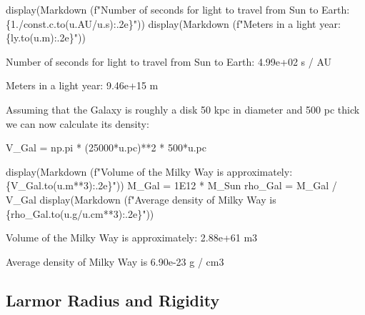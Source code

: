 \documentclass[
  letterpaper,
  DIV=11,
  numbers=noendperiod]{scrreprt}
\newenvironment{Shaded}{\begin{snugshade}}{\end{snugshade}}
\newcommand{\DecValTok}[1]{\textcolor[rgb]{0.68,0.00,0.00}{#1}}
\newcommand{\FloatTok}[1]{\textcolor[rgb]{0.68,0.00,0.00}{#1}}
\newcommand{\NormalTok}[1]{\textcolor[rgb]{0.00,0.23,0.31}{#1}}
\newcommand{\OperatorTok}[1]{\textcolor[rgb]{0.37,0.37,0.37}{#1}}
\newcommand{\SpecialCharTok}[1]{\textcolor[rgb]{0.37,0.37,0.37}{#1}}
\newcommand{\SpecialStringTok}[1]{\textcolor[rgb]{0.13,0.47,0.30}{#1}}
\begin{document}
\begin{tcolorbox}[enhanced jigsaw, toprule=.15mm, colframe=quarto-callout-color-frame, bottomrule=.15mm, leftrule=.75mm, left=2mm, breakable, rightrule=.15mm, arc=.35mm, opacityback=0, colback=white]
\begin{Shaded}
\begin{Highlighting}[]
\NormalTok{display(Markdown (}\SpecialStringTok{f"Number of seconds for light to travel from Sun to Earth: }\SpecialCharTok{\{}\FloatTok{1.}\OperatorTok{/}\NormalTok{const}\SpecialCharTok{.}\NormalTok{c}\SpecialCharTok{.}\NormalTok{to(u.AU}\OperatorTok{/}\NormalTok{u.s)}\SpecialCharTok{:.2e\}}\SpecialStringTok{"}\NormalTok{))}
\NormalTok{display(Markdown (}\SpecialStringTok{f"Meters in a light year: }\SpecialCharTok{\{}\NormalTok{ly}\SpecialCharTok{.}\NormalTok{to(u.m)}\SpecialCharTok{:.2e\}}\SpecialStringTok{"}\NormalTok{))}
\end{Highlighting}
\end{Shaded}

Number of seconds for light to travel from Sun to Earth: 4.99e+02 s / AU

Meters in a light year: 9.46e+15 m

Assuming that the Galaxy is roughly a disk 50 kpc in diameter and 500 pc
thick we can now calculate its density:

\begin{Shaded}
\begin{Highlighting}[]
\NormalTok{V\_Gal }\OperatorTok{=}\NormalTok{  np.pi }\OperatorTok{*}\NormalTok{ (}\DecValTok{25000}\OperatorTok{*}\NormalTok{u.pc)}\OperatorTok{**}\DecValTok{2} \OperatorTok{*} \DecValTok{500}\OperatorTok{*}\NormalTok{u.pc}

\NormalTok{display(Markdown (}\SpecialStringTok{f"Volume of the Milky Way is approximately: }\SpecialCharTok{\{}\NormalTok{V\_Gal}\SpecialCharTok{.}\NormalTok{to(u.m}\OperatorTok{**}\DecValTok{3}\NormalTok{)}\SpecialCharTok{:.2e\}}\SpecialStringTok{"}\NormalTok{))}
\NormalTok{M\_Gal }\OperatorTok{=} \FloatTok{1E12} \OperatorTok{*}\NormalTok{ M\_Sun}
\NormalTok{rho\_Gal }\OperatorTok{=}\NormalTok{ M\_Gal }\OperatorTok{/}\NormalTok{ V\_Gal}
\NormalTok{display(Markdown (}\SpecialStringTok{f"Average density of Milky Way is }\SpecialCharTok{\{}\NormalTok{rho\_Gal}\SpecialCharTok{.}\NormalTok{to(u.g}\OperatorTok{/}\NormalTok{u.cm}\OperatorTok{**}\DecValTok{3}\NormalTok{)}\SpecialCharTok{:.2e\}}\SpecialStringTok{"}\NormalTok{))}
\end{Highlighting}
\end{Shaded}

Volume of the Milky Way is approximately: 2.88e+61 m3

Average density of Milky Way is 6.90e-23 g / cm3

\end{tcolorbox}

\subsection{Larmor Radius and
Rigidity}\label{larmor-radius-and-rigidity}
\end{document}
